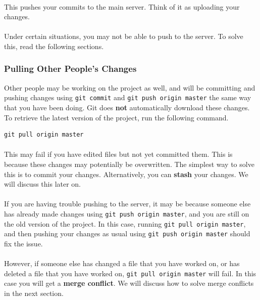 \documentclass[11pt]{article}
\begin{document}
\paragraph{}
This pushes your commits to the main server. Think of it as uploading your changes.
\paragraph{}
Under certain situations, you may not be able to push to the server. To solve this, read the following sections.
\subsubsection{Pulling Other People's Changes}
Other people may be working on the project as well, and will be committing and pushing changes using \lstinline{git commit} and \lstinline{git push origin master} the same way that you have been doing. Git does \textbf{not} automatically download these changes. To retrieve the latest version of the project, run the following command.
\begin{lstlisting}
git pull origin master
\end{lstlisting}
\paragraph{}
This may fail if you have edited files but not yet committed them. This is because these changes may potentially be overwritten. The simplest way to solve this is to commit your changes. Alternatively, you can \textbf{stash} your changes. We will discuss this later on.
\paragraph{}
If you are having trouble pushing to the server, it may be because someone else has already made changes using \lstinline{git push origin master}, and you are still on the old version of the project. In this case, running \lstinline{git pull origin master}, and then pushing your changes as usual using \lstinline{git push origin master} should fix the issue.
\paragraph{}
However, if someone else has changed a file that you have worked on, or has deleted a file that you have worked on, \lstinline{git pull origin master} will fail. In this case you will get a \textbf{merge conflict}. We will discuss how to solve merge conflicts in the next section.
\end{document}
